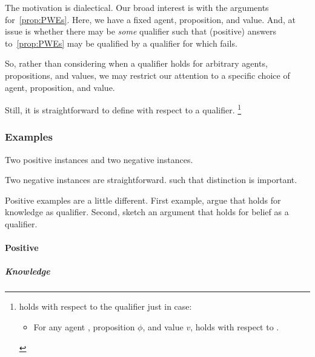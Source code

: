 \begin{note}
  The motivation is dialectical.
  Our broad interest is with the arguments for~\autoref{prop:PWEs}.
  Here, we have a fixed agent, proposition, and value.
  And, at issue is whether there may be \emph{some} qualifier such that (positive) answers to~\autoref{prop:PWEs} may be qualified by a qualifier for which \ptivity{} fails.

  So, rather than considering when a qualifier holds for arbitrary agents, propositions, and values, we may restrict our attention to a specific choice of agent, proposition, and value.

  Still, it is straightforward to define \ptivity{} with respect to a qualifier.%
  \footnote{
     holds with respect to the qualifier \ptivityQV{} just in case:
    \begin{itemize}
    \item[]
      For any agent \vAgent{}, proposition \(\phi\), and value \(v\), \ptivity{} holds with respect to \ptivityQV{}.
    \end{itemize}
  }
\end{note}


\subsubsection{Examples}
\label{cha:zSpA:sec:examples-of-ptivity-y-n}

\begin{note}
  Two positive instances and two negative instances.

  Two negative instances are straightforward.
   such that distinction is important.

  Positive examples are a little different.
  First example, argue that \ptivity{} holds for knowledge as qualifier.
  Second, sketch an argument that \ptivity{} holds for belief as a qualifier.
\end{note}

\paragraph{Positive}

\subparagraph{Knowledge}

